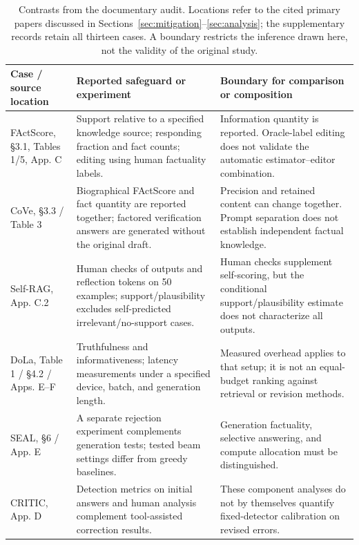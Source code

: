 \begin{table}[t]
\centering\small
\setlength{\tabcolsep}{4pt}\renewcommand{\arraystretch}{1.05}
\begin{tabularx}{\textwidth}{@{}>{\raggedright\arraybackslash}p{}>{\raggedright\arraybackslash}p{}>{\raggedright\arraybackslash}X@{}}
\toprule
Case / source location & Reported safeguard or experiment & Boundary for comparison or composition \\\midrule
FActScore, \S3.1, Tables 1/5, App. C & Support relative to a specified knowledge source; responding fraction and fact counts; editing using human factuality labels. & Information quantity is reported. Oracle-label editing does not validate the automatic estimator--editor combination. \\
CoVe, \S3.3 / Table 3 & Biographical FActScore and fact quantity are reported together; factored verification answers are generated without the original draft. & Precision and retained content can change together. Prompt separation does not establish independent factual knowledge. \\
Self-RAG, App. C.2 & Human checks of outputs and reflection tokens on 50 examples; support/plausibility excludes self-predicted irrelevant/no-support cases. & Human checks supplement self-scoring, but the conditional support/plausibility estimate does not characterize all outputs. \\
DoLa, Table 1 / \S4.2 / Apps. E--F & Truthfulness and informativeness; latency measurements under a specified device, batch, and generation length. & Measured overhead applies to that setup; it is not an equal-budget ranking against retrieval or revision methods. \\
SEAL, \S6 / App. E & A separate rejection experiment complements generation tests; tested beam settings differ from greedy baselines. & Generation factuality, selective answering, and compute allocation must be distinguished. \\
CRITIC, App. D & Detection metrics on initial answers and human analysis complement tool-assisted correction results. & These component analyses do not by themselves quantify fixed-detector calibration on revised errors. \\
\bottomrule
\end{tabularx}
\caption{Contrasts from the documentary audit. Locations refer to the cited primary papers discussed in Sections~\ref{sec:mitigation}--\ref{sec:analysis}; the supplementary records retain all thirteen cases. A boundary restricts the inference drawn here, not the validity of the original study.}
\label{tab:method-comparison}
\end{table}
